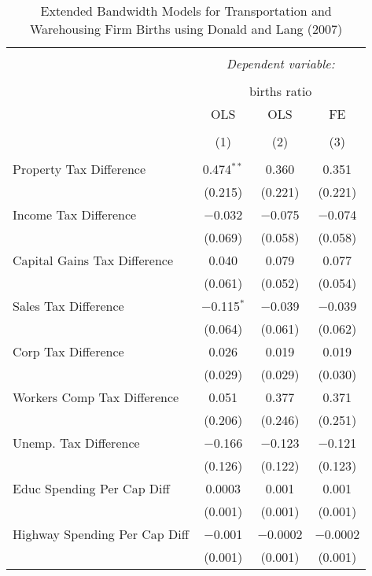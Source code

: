 
\begin{table}[!htbp] \centering 
  \caption{Extended Bandwidth Models for  Transportation and Warehousing Firm Births using Donald and Lang (2007)} 
  \label{} 
\begin{tabular}{@{\extracolsep{5pt}}lccc} 
\\[-1.8ex]\hline 
\hline \\[-1.8ex] 
 & \multicolumn{3}{c}{\textit{Dependent variable:}} \\ 
\cline{2-4} 
\\[-1.8ex] & \multicolumn{3}{c}{births ratio} \\ 
 & OLS & OLS & FE \\ 
\\[-1.8ex] & (1) & (2) & (3)\\ 
\hline \\[-1.8ex] 
 Property Tax Difference & 0.474$^{**}$ & 0.360 & 0.351 \\ 
  & (0.215) & (0.221) & (0.221) \\ 
  Income Tax Difference & $-$0.032 & $-$0.075 & $-$0.074 \\ 
  & (0.069) & (0.058) & (0.058) \\ 
  Capital Gains Tax Difference & 0.040 & 0.079 & 0.077 \\ 
  & (0.061) & (0.052) & (0.054) \\ 
  Sales Tax Difference & $-$0.115$^{*}$ & $-$0.039 & $-$0.039 \\ 
  & (0.064) & (0.061) & (0.062) \\ 
  Corp Tax Difference & 0.026 & 0.019 & 0.019 \\ 
  & (0.029) & (0.029) & (0.030) \\ 
  Workers Comp Tax Difference & 0.051 & 0.377 & 0.371 \\ 
  & (0.206) & (0.246) & (0.251) \\ 
  Unemp. Tax Difference & $-$0.166 & $-$0.123 & $-$0.121 \\ 
  & (0.126) & (0.122) & (0.123) \\ 
  Educ Spending Per Cap Diff & 0.0003 & 0.001 & 0.001 \\ 
  & (0.001) & (0.001) & (0.001) \\ 
  Highway Spending Per Cap Diff & $-$0.001 & $-$0.0002 & $-$0.0002 \\ 
  & (0.001) & (0.001) & (0.001) \\ 

\end{tabular}
\end{table}
